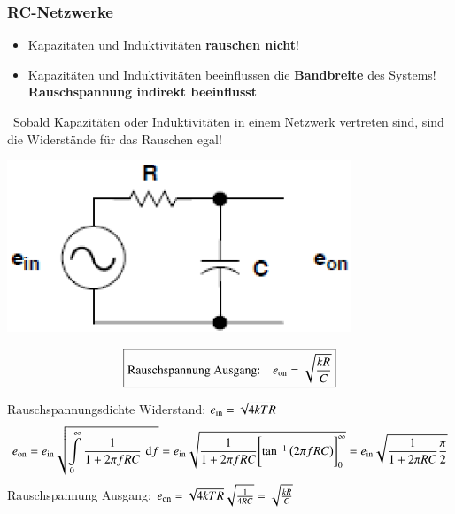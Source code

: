 \subsubsection{RC-Netzwerke}

\begin{itemize}
    \item Kapazitäten und Induktivitäten \textbf{rauschen nicht}!
    \item Kapazitäten und Induktivitäten beeinflussen die \textbf{Bandbreite} des Systems! \\
        \textbf{Rauschspannung indirekt beeinflusst}
\end{itemize}

\vspace{0.2cm}
\textrightarrow\ Sobald Kapazitäten oder Induktivitäten in einem Netzwerk vertreten sind, sind die Widerstände für das Rauschen egal!

\begin{minipage}[c]{0.28\columnwidth}
    \includegraphics[width=\columnwidth]{images/rc_rauschen.png}
\end{minipage}
\hfill
\begin{minipage}[c]{0.7\columnwidth}
    $$ \boxed{ \text{Rauschspannung Ausgang:} \quad e_{\rm on} = \sqrt{\frac{k R }{C}} } $$
\end{minipage}


    
Rauschspannungsdichte Widerstand: $e_{\rm in} = \sqrt{4 k T R}$
$$ e_{\rm on} = e_{\rm in} \sqrt{ \int\limits_{0}^{\infty} \frac{1}{1 + 2 \pi f R C} \, \mathop{} \! \mathrm{d} f }
    = e_{\rm in} \sqrt{\frac{1}{1 + 2 \pi f R C} \Biggl[ \tan^{-1}\big( 2 \pi f R C \big) \Biggr]_{0}^{\infty} } 
    = e_{\rm in} \sqrt{\frac{1}{1 + 2 \pi R C} \frac{\pi}{2} } $$
Rauschspannung Ausgang: \quad $e_{\rm on} = \sqrt{4 k T R} \sqrt{\frac{1}{4 R C}} = \sqrt{\frac{k R }{C}} $


